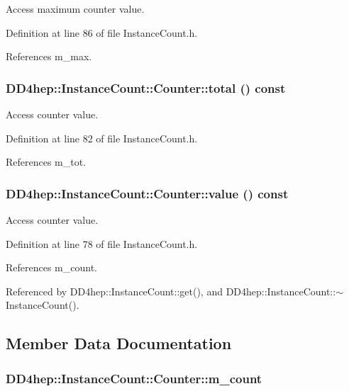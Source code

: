 Access maximum counter value. 

Definition at line 86 of file InstanceCount.h.

References m\_\-max.\hypertarget{class_d_d4hep_1_1_instance_count_1_1_counter_a6ccf7f6ed0ba207d805246dc11c73cd8}{
\subsubsection[{total}]{ DD4hep::InstanceCount::Counter::total () const}}
\label{class_d_d4hep_1_1_instance_count_1_1_counter_a6ccf7f6ed0ba207d805246dc11c73cd8}


Access counter value. 

Definition at line 82 of file InstanceCount.h.

References m\_\-tot.\hypertarget{class_d_d4hep_1_1_instance_count_1_1_counter_a948d52225beb0bea4fff6ef6c5066897}{
\subsubsection[{value}]{ DD4hep::InstanceCount::Counter::value () const}}
\label{class_d_d4hep_1_1_instance_count_1_1_counter_a948d52225beb0bea4fff6ef6c5066897}


Access counter value. 

Definition at line 78 of file InstanceCount.h.

References m\_\-count.

Referenced by DD4hep::InstanceCount::get(), and DD4hep::InstanceCount::$\sim$InstanceCount().

\subsection{Member Data Documentation}
\hypertarget{class_d_d4hep_1_1_instance_count_1_1_counter_add94845aa9120ee3daa350d46f2ee919}{
\subsubsection[{m\_\-count}]{ {\bf DD4hep::InstanceCount::Counter::m\_\-count}}}
\label{class_d_d4hep_1_1_instance_count_1_1_counter_add94845aa9120ee3daa350d46f2ee919}



